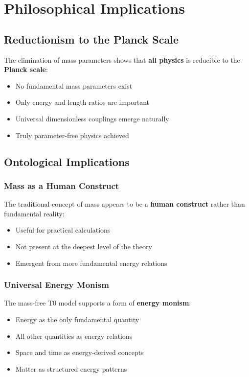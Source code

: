 	\section{Philosophical Implications}
	\label{sec:philosophical}
	
	\subsection{Reductionism to the Planck Scale}
	\label{subsec:reductionism}
	
	The elimination of mass parameters shows that \textbf{all physics} is reducible to the \textbf{Planck scale}:
	
	\begin{itemize}
		\item No fundamental mass parameters exist
		\item Only energy and length ratios are important
		\item Universal dimensionless couplings emerge naturally
		\item Truly parameter-free physics achieved
	\end{itemize}
	
	\subsection{Ontological Implications}
	\label{subsec:ontological}
	
	\subsubsection{Mass as a Human Construct}
	
	The traditional concept of mass appears to be a \textbf{human construct} rather than fundamental reality:
	
	\begin{itemize}
		\item Useful for practical calculations
		\item Not present at the deepest level of the theory
		\item Emergent from more fundamental energy relations
	\end{itemize}
	
	\subsubsection{Universal Energy Monism}
	
	The mass-free T0 model supports a form of \textbf{energy monism}:
	\begin{itemize}
		\item Energy as the only fundamental quantity
		\item All other quantities as energy relations
		\item Space and time as energy-derived concepts
		\item Matter as structured energy patterns
	\end{itemize}
